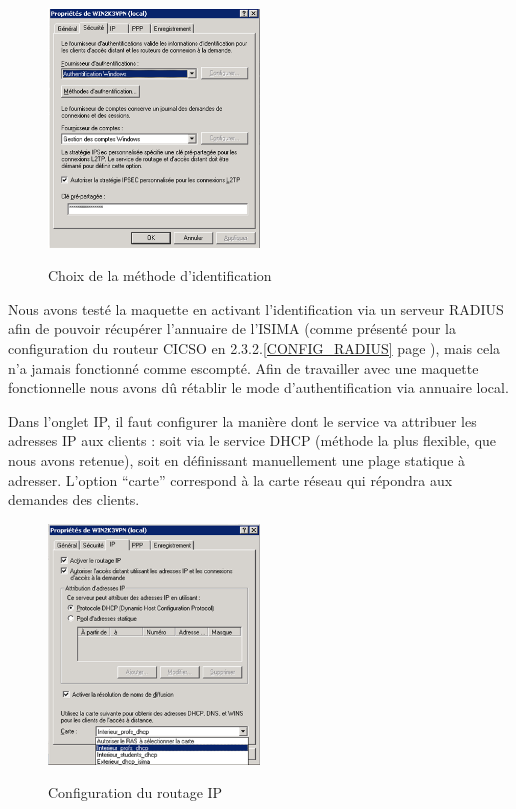 \begin{figure}[H]
	\begin{center}
		\includegraphics[width=0.50\textwidth]{partie_2/screen_windows/secu_vpn.PNG}\\
	\end{center}
	\caption{Choix de la méthode d'identification}
	\label{VPN_AUTHENTIFICATION}
\end{figure}

Nous avons testé la maquette en activant l'identification via un serveur RADIUS afin de pouvoir récupérer l'annuaire de l'ISIMA (comme présenté pour la configuration du routeur CICSO en 2.3.2.\ref{CONFIG_RADIUS} page \pageref{CONFIG_RADIUS}), mais cela n'a jamais fonctionné comme escompté. Afin de travailler avec une maquette fonctionnelle nous avons dû rétablir le mode d'authentification via annuaire local.

Dans l'onglet IP, il faut configurer la manière dont le service va attribuer les adresses IP aux clients : soit via le service DHCP (méthode la plus flexible, que nous avons retenue), soit en définissant manuellement une plage statique à adresser. L'option ``carte'' correspond à la carte réseau qui répondra aux demandes des clients.

\begin{figure}[H]
	\begin{center}
		\includegraphics[width=0.50\textwidth]{partie_2/screen_windows/choix_carte.PNG}\\
	\end{center}
	\caption{Configuration du routage IP}
	\label{VPN_CARTE_ECOUTE}
\end{figure}

